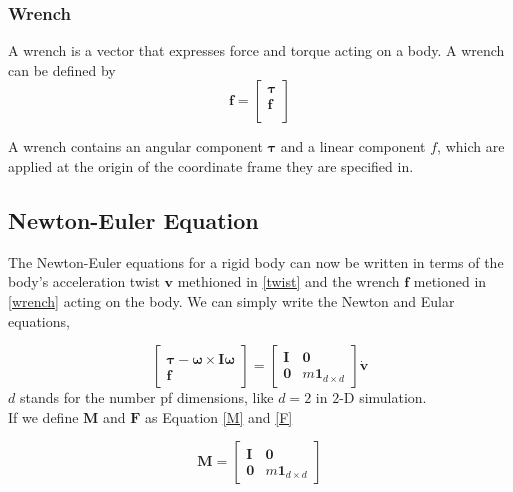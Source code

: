     \subsubsection{Wrench}
        A wrench is a vector that expresses force and torque acting on a body. A wrench can be defined by
        \begin{equation}
            \mathbf{f} = \left[ \begin{array}{c} \pmb{\tau} \\ \pmb{f} \\ \end{array} \right]
            \label{wrench} 
        \end{equation}

        A wrench contains an angular component $\pmb{\tau}$ and a linear component $f$, which are applied at the origin of the coordinate frame they are specified in.


\subsection{Newton-Euler Equation}
    The Newton-Euler equations for a rigid body can now be written in terms of the body's acceleration twist $\mathbf{v}$ methioned in \ref{twist} and the wrench $\mathbf{f}$ metioned in \ref{wrench} acting on the body. We can simply write the Newton and Eular equations,

    \begin{equation}
        \left[ \begin{array}{c} \pmb{\tau} - \pmb{\omega} \times \pmb{I} \pmb{\omega}\\ \pmb{f} \end{array}\right] = \left[ \begin{array}{cc} \pmb{I} & \pmb{0} \\ \pmb{0}& m\pmb{1}_{d\times d}\end{array} \right] \dot{\mathbf{v}}
    \end{equation}
    $d$ stands for the number pf dimensions, like $d=2$ in $2$-D simulation. \\

    If we define $\pmb{M}$ and $\mathbf{F}$ as Equation \ref{M} and \ref{F}

    \begin{equation}
        \pmb{M} = \left[ \begin{array}{cc} \pmb{I} & \pmb{0} \\ \pmb{0} & m\pmb{1}_{d \times d}\end{array} \right]
        \label{M}
    \end{equation}

